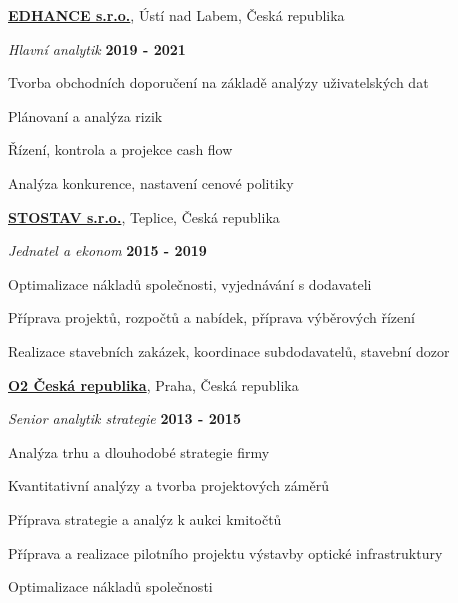 \documentclass[10pt]{article}
\newenvironment{outerlist}[0]%
        {\begin{itemize}}
	{\end{itemize}
         \vspace{-.6\baselineskip}}
\newenvironment{innerlist}[0]%
        {\begin{compactitem}}
	{\end{compactitem}}
\newcommand{\blankline}{\quad\pagebreak[2]}
\begin{document}
\href{http://www.edhance.cz}{\textbf{EDHANCE s.r.o.}}, 
Ústí nad Labem, Česká republika

\begin{outerlist}
	\item[] \textit{Hlavní analytik}%
		\hfill \textbf{2019 - 2021}
	\begin{innerlist}
		\item Tvorba obchodních doporučení na základě analýzy uživatelských dat
		\item Plánovaní a analýza rizik
		\item Řízení, kontrola a projekce cash flow
		\item Analýza konkurence, nastavení cenové politiky
		
	\end{innerlist}
\end{outerlist}
\blankline


\href{http://www.stostav.cz}{\textbf{STOSTAV s.r.o.}}, 
Teplice, Česká republika

\begin{outerlist}
	\item[] \textit{Jednatel a ekonom}%
		\hfill \textbf{2015 - 2019}
	\begin{innerlist}
		\item Optimalizace nákladů společnosti, vyjednávání s dodavateli
		\item Příprava projektů, rozpočtů a nabídek, příprava výběrových řízení
		\item Realizace stavebních zakázek, koordinace subdodavatelů, stavební dozor		
	\end{innerlist}
\end{outerlist}
\blankline


\href{http://www.o2.cz/}{\textbf{O2 Česká republika}},
Praha, Česká republika
\begin{outerlist}
	\item[] \textit{Senior analytik strategie}%
		\hfill \textbf{2013 - 2015}
	\begin{innerlist}
		\item Analýza trhu a dlouhodobé strategie firmy
		\item Kvantitativní analýzy a tvorba projektových záměrů
		\item Příprava strategie a analýz k aukci kmitočtů
		\item Příprava a realizace pilotního projektu výstavby optické infrastruktury
		\item Optimalizace nákladů společnosti
	\end{innerlist}
\end{outerlist}
\blankline
\end{document}
